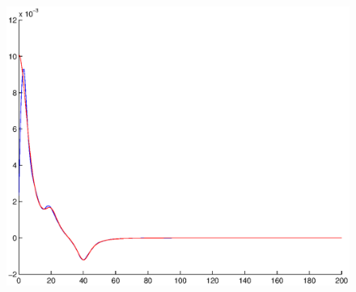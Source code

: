 \documentclass[A4paper,11pt]{article}
\theoremstyle{definition}
\begin{document}
\begin{figure}[H]
\begin{minipage}{.33\textwidth}
  \centering
  \vspace{0.2cm}
  \includegraphics[scale=0.25]{pictures/Example7/Fig4.eps}
  \label{fig:7_4}
\end{minipage}%
\end{figure}
\end{document}
